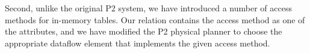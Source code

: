 Second, unlike the original P2 system, we have introduced a number of access
methods for in-memory tables.  Our  relation contains the access
method as one of the attributes, and we have modified the P2 physical planner
to choose the appropriate dataflow element that implements the given access
method.



